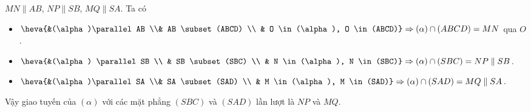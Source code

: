 \begin{ex}
{	$MN \parallel AB$, $NP  \parallel SB$, $MQ \parallel SA$.
	Ta có\begin{itemize}
	\item $\heva{&(\alpha)\parallel AB \\& AB \subset (ABCD)  \\
	& O \in (\alpha), O \in (ABCD)} \Rightarrow (\alpha) \cap  (ABCD)=MN$ qua $O$.
	\item $\heva{&(\alpha)  \parallel SB \\
	& SB \subset (SBC)  \\
	& N \in (\alpha), N  \in (SBC)}\Rightarrow (\alpha) \cap (SBC)=NP \parallel SB$.
	\item $\heva{&(\alpha)\parallel SA \\& SA  \subset (SAD) \\
	& M \in (\alpha), M \in (SAD)} \Rightarrow (\alpha) \cap (SAD)=MQ  \parallel SA$.
	\end{itemize}
	 Vậy giao tuyến của $(\alpha)$ với các mặt phẳng $(SBC)$ và $(SAD)$ lần lượt là $NP$ và $MQ$.
 }
\end{ex}

